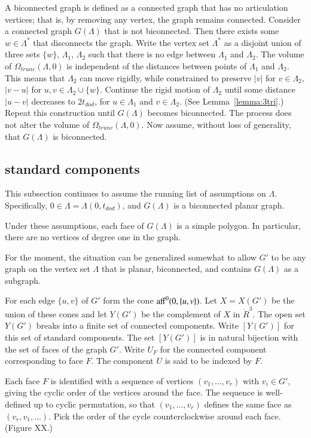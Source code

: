 A biconnected graph is defined as a connected graph that has no
articulation vertices; that is, by removing any vertex, the
graph remains connected.
Consider a connected graph $G(\Lambda)$ that is not biconnected.
Then there exists some $w\in \Lambda^*$ that disconnects
the graph.  Write the vertex set $\Lambda^*$
as a disjoint union of three sets
$\{w\}$, $\Lambda_1$, $\Lambda_2$ such that there is no edge between
$\Lambda_1$ and $\Lambda_2$.  The volume of $\Omega_{trunc}(\Lambda,0)$
is independent of the distances between points of $\Lambda_1$ and
$\Lambda_2$.  This means that  $\Lambda_2$ can move rigidly,
while constrained to preserve $|v|$ for $v\in\Lambda_2$, $|v-u|$
for $u,v\in \Lambda_2\cup\{w\}$. 
Continue the rigid motion of $\Lambda_2$ until some distance
$|u-v|$ decreases to $2t_{dod}$, for
$u\in\Lambda_1$ and $v\in\Lambda_2$. (See Lemma~\ref{lemma:3tri}.) 
Repeat this construction until $G(\Lambda)$ becomes biconnected.  The process does not alter the volume of $\Omega_{trunc}(\Lambda,0)$.
Now assume, without loss of generality, that $G(\Lambda)$ is
biconnected.



\subsection{standard components}

This subsection continues to assume 
the running list of assumptions on $\Lambda$.  Specifically,
$0\in\Lambda = \Lambda(0,t_{dod})$, and $G(\Lambda)$ is a 
biconnected planar graph.

Under these assumptions, each face of $G(\Lambda)$ is a simple
polygon.  In particular, there are no vertices of degree one 
in the graph.

For the moment, the situation can be generalized somewhat to
allow $G'$ to be any graph on the vertex set $\Lambda$ that
is planar, biconnected, and contains $G(\Lambda)$
as a subgraph.

For each edge $\{u,v\}$ of $G'$ form the cone
${\operatorname{aff}}^0(0,\{u,v\})$.  Let $X=X(G')$ be the union of these
cones and let $Y(G')$ be the complement of $X$ in $\ring{R}^3$.
The open set $Y(G')$ breaks into a finite set of connected
components. 
Write $[Y(G')]$ for this set of standard
components.  The set $[Y(G')]$ is in natural bijection with
the set of faces of the graph $G'$.  Write $U_F$ for the 
connected component corresponding to face $F$.  The component
 $U$ is said to be indexed by $F$.

Each face $F$ is identified with a sequence of vertices
$(v_1,\ldots,v_r)$ with $v_i\in G'$, giving the cyclic
order of the vertices around the face.  The sequence is well-
defined up to cyclic permutation, so that $(v_1,\ldots,v_r)$
defines the same face as $(v_r,v_1,\ldots)$.  Pick the
order of the cycle counterclockwise around each face.  
 (Figure XX.)

